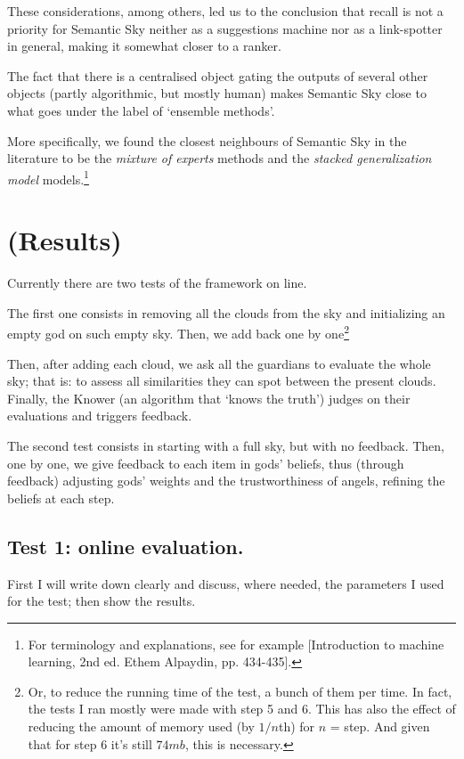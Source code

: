 \documentclass[11pt]{article}
\begin{document}
These considerations, among others, led us to the conclusion that recall is not a priority for Semantic Sky neither as a suggestions machine nor as a link-spotter in general, making it somewhat closer to a ranker.

The fact that there is a centralised object gating the outputs of several other objects (partly algorithmic, but mostly human) makes Semantic Sky close to what goes under the label of `ensemble methods'.

More specifically, we found the closest neighbours of Semantic Sky in the literature to be the \emph{mixture of experts} methods and the \emph{stacked generalization model} models.\footnote{For terminology and explanations, see for example [Introduction to machine learning, 2nd ed. Ethem Alpaydin, pp. 434-435].}


\section{(Results)}

Currently there are two tests of the framework on line.

The first one consists in removing all the clouds from the sky and initializing an empty god on such empty sky. Then, we add back one by one\footnote{Or, to reduce the running time of the test, a bunch of them per time. In fact, the tests I ran mostly were made with step 5 and 6. This has also the effect of reducing the amount of memory used (by $1/n$th) for $n$ = step. And given that for step 6 it's still $74mb$, this is necessary.}

Then, after adding each cloud, we ask all the guardians to evaluate the whole sky; that is: to assess all similarities they can spot between the present clouds. Finally, the Knower (an algorithm that `knows the truth') judges on their evaluations and triggers feedback.

The second test consists in starting with a full sky, but with no feedback. Then, one by one, we give feedback to each item in gods' beliefs, thus (through feedback) adjusting gods' weights and the trustworthiness of angels, refining the beliefs at each step.

\subsection{Test 1: online evaluation.}

First I will write down clearly and discuss, where needed, the parameters I used for the test; then show the results.
\end{document}
